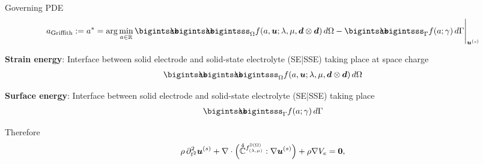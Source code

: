 \documentclass[25pt, a0paper,
portrait,
margin=2mm, 
innermargin=2mm, 
blockverticalspace=7mm, %
colspace=2mm, %
subcolspace=0mm]{tikzposter}
\begin{document}
{\begin{minipage}{0.43\textwidth}
\begin{mdframed}
			Governing PDE
			\begin{align*}
				a_{\text{Griffith}} := a^{*} = \arg\min_{a\in\mathbb{R}}{\bigintsss\!\!\!\!\!\!\bigintsss\!\!\!\!\!\!\bigintsss_{\Omega} f(a,\bm{u};\lambda,\mu,\bm{d}\otimes\bm{d}) \, d\Omega - \bigintsss\!\!\!\!\!\!\bigintsss_{\Gamma} f(a;\gamma) \, d\Gamma}\Bigg|_{\bm{u}^{(s)}}
			\end{align*}
		\end{mdframed}
		\begin{minipage}{0.5\textwidth}
			\begin{mdframed}
				\textbf{Strain energy}: 
				Interface between solid electrode and solid-state electrolyte (SE|SSE) 
				taking place at space charge
				\begin{align*}
					\bigintsss\!\!\!\!\!\!\bigintsss\!\!\!\!\!\!\bigintsss_{\Omega}
					f(a,\bm{u};\lambda,\mu,\bm{d}\otimes\bm{d}) \, d\Omega 
				\end{align*}
			\end{mdframed}
		\end{minipage}
		\hfill 
		\begin{minipage}{0.49\textwidth}
			\begin{mdframed}
				\textbf{Surface energy}: 
				Interface between solid electrode and solid-state electrolyte (SE|SSE) 
				taking place 
				\begin{align*} 
					\bigintsss\!\!\!\!\!\!\bigintsss_{\Gamma} f(a;\gamma) \, d\Gamma
				\end{align*}
			\end{mdframed}
		\end{minipage}
		\begin{mdframed}
			Therefore
			\begin{align*}
				 & \rho\,
				\partial^2_{t^2}
				\bm{u}^{(s)}
				+
				\nabla \cdot
				\Big(
				\accentset{\scriptstyle 4}{\mathbb{C}}^{f^{\mathbb{D}(\Omega)}_{(\lambda,\mu)}}
				:\nabla\Bu^{(s)}
				\Big)
				+
				\rho\nabla V_{e}
				= \textbf{0},                                                                                                                                                                                                                                                               \\

\end{align*}
\end{mdframed}
\end{minipage}}
\end{document}

